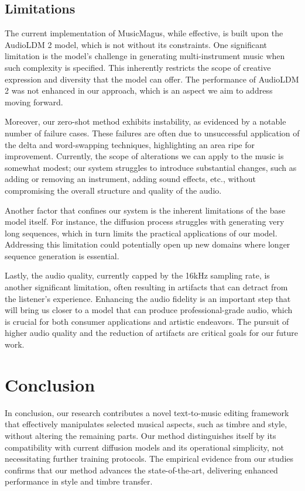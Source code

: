\subsection{Limitations}

The current implementation of MusicMagus, while effective, is built upon the AudioLDM 2 model, which is not without its constraints. One significant limitation is the model's challenge in generating multi-instrument music when such complexity is specified. This inherently restricts the scope of creative expression and diversity that the model can offer. The performance of AudioLDM 2 was not enhanced in our approach, which is an aspect we aim to address moving forward.

Moreover, our zero-shot method exhibits instability, as evidenced by a notable number of failure cases. These failures are often due to unsuccessful application of the delta and word-swapping techniques, highlighting an area ripe for improvement. Currently, the scope of alterations we can apply to the music is somewhat modest; our system struggles to introduce substantial changes, such as adding or removing an instrument, adding sound effects, etc., without compromising the overall structure and quality of the audio.

Another factor that confines our system is the inherent limitations of the base model itself. For instance, the diffusion process struggles with generating very long sequences, which in turn limits the practical applications of our model. Addressing this limitation could potentially open up new domains where longer sequence generation is essential.

Lastly, the audio quality, currently capped by the 16kHz sampling rate, is another significant limitation, often resulting in artifacts that can detract from the listener's experience. Enhancing the audio fidelity is an important step that will bring us closer to a model that can produce professional-grade audio, which is crucial for both consumer applications and artistic endeavors. The pursuit of higher audio quality and the reduction of artifacts are critical goals for our future work.

\section{Conclusion}

In conclusion, our research contributes a novel text-to-music editing framework that effectively manipulates selected musical aspects, such as timbre and style, without altering the remaining parts. Our method distinguishes itself by its compatibility with current diffusion models and its operational simplicity, not necessitating further training protocols. The empirical evidence from our studies confirms that our method advances the state-of-the-art, delivering enhanced performance in style and timbre transfer.

